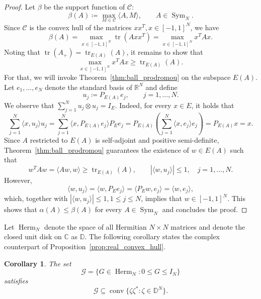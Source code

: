 \documentclass[reqno,a4paper,12pt]{amsart}
\numberwithin{equation}{section}
\newtheorem{corollary}[definition]{Corollary}
\def\C{{\mathbb C}}
\def\D{{\mathbb D}}
\newcommand\1{\mathds{1}}
\DeclareMathOperator{\tr}{tr}
\DeclareMathOperator{\sym}{Sym}
\DeclareMathOperator{\herm}{Herm}
\DeclareMathOperator{\conv}{conv}
\begin{document}
\begin{proof}
Let $\beta$ be the support function of $\mathcal C$:
\begin{equation*}
\beta(A)\coloneqq\max_{M\in\mathcal C}\langle A,M\rangle,
\qquad A\in\operatorname{Sym}_N.
\end{equation*}
Since $\mathcal C$ is the convex hull of the matrices $xx^T, x\in [-1,1]^N$, we have
\begin{equation*}
\beta(A)=\max_{x\in [-1,1]^N}\tr(Axx^T)
=
\max_{x\in [-1,1]^N}x^TAx.
\end{equation*}
Noting that $\tr(A_+)=\tr_{E(A)}(A)$, it remains to show that 
\begin{equation*}
    \max_{x\in [-1,1]^N}x^TAx\geq \tr_{E(A)}(A).
\end{equation*}
For that, we will invoke Theorem~\ref{thm:ball_prodromou} on the subspace $E(A)$. Let $e_1,\dots,e_N$ denote the standard basis of $\mathbb R^N$ and define
\begin{equation*}
u_j\coloneqq P_{E(A)} e_j,
\qquad j=1,\dots,N.
\end{equation*}
We observe that $\sum_{j=1}^N u_j\otimes u_j=I_E$. Indeed, for every $x\in E$, it holds that
\begin{equation*}
\sum_{j=1}^N \langle x,u_j\rangle u_j
=
\sum_{j=1}^N \langle x,P_{E(A)}e_j\rangle P_Ee_j
=
P_{E(A)}\left(\sum_{j=1}^N \langle x,e_j\rangle e_j\right)
=
P_{E(A)} x
=
x.
\end{equation*}
Since $A$ restricted to $E(A)$ is self-adjoint and positive semi-definite, Theorem~\ref{thm:ball_prodromou} guarantees the existence of $w\in E(A)$ such that
\begin{equation*}
w^TAw=\langle Aw,w\rangle\ge \tr_{E(A)}(A),
\qquad
|\langle w,u_j\rangle|\le 1,\quad j=1,\dots,N.
\end{equation*}
However,
\begin{equation*}
\langle w,u_j\rangle
=
\langle w,P_Ee_j\rangle
=
\langle P_Ew,e_j\rangle
=
\langle w,e_j\rangle,
\end{equation*}
which, together with $|\langle w,u_j\rangle|\le 1, 1\le j\le N$, implies that $w\in [-1,1]^N$. This shows that $\alpha(A)\le \beta(A)$ for every $A\in\sym_N$ and concludes the proof.
\end{proof}
Let $\herm_N$ denote the space of all Hermitian $N\times N$ matrices and denote the closed unit disk on $\C$ as $\D$. The following corollary states the complex counterpart of Proposition~\ref{prop:real_convex_hull}.
\begin{corollary}\label{cor:complex_convec_hull}
    The set
    \begin{equation*}
        \mathcal G=\{G\in \herm_N:0\le G\le I_N\}
    \end{equation*}
    satisfies
    \begin{equation*}
        \mathcal G\subseteq \conv\{\zeta\zeta^*:\zeta\in \D^N\}.
    \end{equation*}
\end{corollary}
\end{document}
